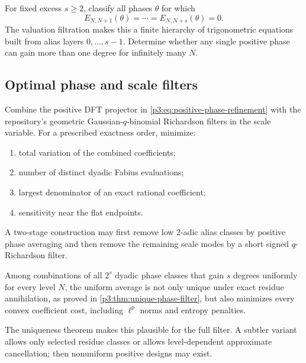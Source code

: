\documentclass[11pt,oneside]{article}
\numberwithin{equation}{section}
\theoremstyle{definition}
\theoremstyle{remark}
\begin{document}
\begin{problem}
\label{p3:prob:higher-phase-gains}
For fixed excess $s\ge2$, classify all phases $\theta$ for which
\[
 E_{N,N+1}(\theta)=\cdots=E_{N,N+s}(\theta)=0.
\]
The valuation filtration makes this a finite hierarchy of trigonometric equations built from alias layers $0,\ldots,s-1$.  Determine whether any single positive phase can gain more than one degree for infinitely many $N$.
\end{problem}

\subsection{Optimal phase and scale filters}

\begin{problem}
\label{p3:prob:hybrid-filter}
Combine the positive DFT projector in \eqref{p3:eq:positive-phase-refinement} with the repository's geometric Gaussian-$q$-binomial Richardson filters in the scale variable.  For a prescribed exactness order, minimize:
\begin{enumerate}
\item total variation of the combined coefficients;
\item number of distinct dyadic Fabius evaluations;
\item largest denominator of an exact rational coefficient;
\item sensitivity near the flat endpoints.
\end{enumerate}
A two-stage construction may first remove low $2$-adic alias classes by positive phase averaging and then remove the remaining scale modes by a short signed $q$-Richardson filter.
\end{problem}

\begin{conjecture}
\label{p3:conj:positive-extremality}
Among combinations of all $2^s$ dyadic phase classes that gain $s$ degrees uniformly for every level $N$, the uniform average is not only unique under exact residue annihilation, as proved in \cref{p3:thm:unique-phase-filter}, but also minimizes every convex coefficient cost, including $\ell^p$ norms and entropy penalties.
\end{conjecture}

The uniqueness theorem makes this plausible for the full filter.  A subtler variant allows only selected residue classes or allows level-dependent approximate cancellation; then nonuniform positive designs may exist.
\end{document}
